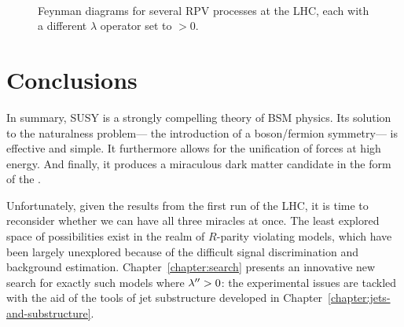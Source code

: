 

\begin{figure}
\centering
{}
\\
\label{fig:susy:rpv_diagrams}
\caption{Feynman diagrams for several RPV processes at the LHC, each with a different $\lambda$ operator set to $>0$.}
\end{figure}



\section{Conclusions}

In summary, SUSY is a strongly compelling theory of BSM physics. Its solution to the naturalness problem--- the introduction of a boson/fermion symmetry--- is effective and simple. It furthermore allows for the unification of forces at high energy. And finally, it produces a miraculous dark matter candidate in the form of the \lsp.

Unfortunately, given the results from the first run of the LHC, it is time to reconsider whether we can have all three miracles at once. The least explored space of possibilities exist in the realm of $R$-parity violating models, which have been largely unexplored because of the difficult signal discrimination and background estimation. Chapter~\ref{chapter:search} presents an innovative new search for exactly such models where $\lambda^{\prime\prime} > 0$: the experimental issues are tackled with the aid of the tools of jet substructure developed in Chapter~\ref{chapter:jets-and-substructure}.